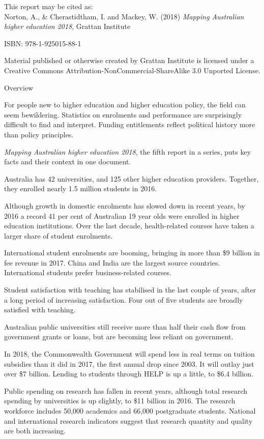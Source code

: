 \documentclass[]{book}
\begin{document}
This report may be cited as:\\
Norton, A., \& Cherastidtham, I. and Mackey, W. (2018) \emph{Mapping Australian higher education 2018}, Grattan Institute

ISBN: 978-1-925015-88-1

Material published or otherwise created by Grattan Institute is licensed under a Creative Commons Attribution-NonCommercial-ShareAlike 3.0 Unported License.

Overview

For people new to higher education and higher education policy, the field can seem bewildering. Statistics on enrolments and performance are surprisingly difficult to find and interpret. Funding entitlements reflect political history more than policy principles.

\emph{Mapping Australian higher education 2018}, the fifth report in a series, puts key facts and their context in one document.

Australia has 42 universities, and 125 other higher education providers. Together, they enrolled nearly 1.5 million students in 2016.

Although growth in domestic enrolments has slowed down in recent years, by 2016 a record 41 per cent of Australian 19 year olds were enrolled in higher education institutions. Over the last decade, health-related courses have taken a larger share of student enrolments.

International student enrolments are booming, bringing in more than \$9 billion in fee revenue in 2017. China and India are the largest source countries. International students prefer business-related courses.

Student satisfaction with teaching has stabilised in the last couple of years, after a long period of increasing satisfaction. Four out of five students are broadly satisfied with teaching.

Australian public universities still receive more than half their cash flow from government grants or loans, but are becoming less reliant on government.

In 2018, the Commonwealth Government will spend less in real terms on tuition subsidies than it did in 2017, the first annual drop since 2003. It will outlay just over \$7 billion. Lending to students through HELP is up a little, to \$6.4 billion.

Public spending on research has fallen in recent years, although total research spending by universities is up slightly, to \$11 billion in 2016. The research workforce includes 50,000 academics and 66,000 postgraduate students. National and international research indicators suggest that research quantity and quality are both increasing.
\end{document}
